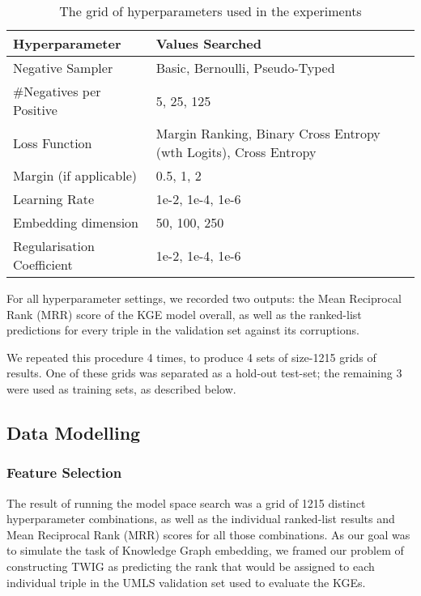 \begin{table}
    \centering
    \begin{tabular}{p{3cm}|p{5cm}}
         \textbf{Hyperparameter}& \textbf{Values Searched}\\ \hline
         Negative Sampler& Basic, Bernoulli, Pseudo-Typed\\
        \#Negatives per Positive& 5, 25, 125\\
         Loss Function& Margin Ranking, Binary Cross Entropy (wth Logits), Cross Entropy\\
         Margin (if applicable)& 0.5, 1, 2\\
         Learning Rate& 1e-2, 1e-4, 1e-6\\
         Embedding dimension& 50, 100, 250\\
         Regularisation Coefficient& 1e-2, 1e-4, 1e-6\\
    \end{tabular}
    \caption{The grid of hyperparameters used in the experiments}
    \label{tab:hp-grid}
\end{table}

For all hyperparameter settings, we recorded two outputs: the Mean Reciprocal Rank (MRR) score of the KGE model overall, as well as the ranked-list predictions for every triple in the validation set against its corruptions.

We repeated this procedure 4 times, to produce 4 sets of size-1215 grids of results. One of these grids was separated as a hold-out test-set; the remaining 3 were used as training sets, as described below.

\subsection{Data Modelling}
\subsubsection{Feature Selection}
The result of running the model space search was a grid of 1215 distinct hyperparameter combinations, as well as the individual ranked-list results and Mean Reciprocal Rank (MRR) scores for all those combinations. As our goal was to simulate the task of Knowledge Graph embedding, we framed our problem of constructing TWIG as predicting the rank that would be assigned to each individual triple in the UMLS validation set used to evaluate the KGEs.

